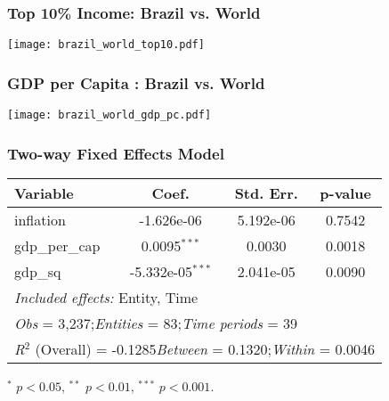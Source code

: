 \documentclass{beamer}
\begin{document}
\begin{frame}
    \frametitle{\Large Top 10\% Income: Brazil vs. World}
    \centering
    \texttt{[image: brazil\_world\_top10.pdf]}
    \vspace{0.3cm}
    \footnotesize
\end{frame}

\begin{frame}
    \frametitle{\Large GDP per Capita : Brazil vs. World}
    \centering
    \texttt{[image: brazil\_world\_gdp\_pc.pdf]}
    \vspace{0.3cm}
    \footnotesize
\end{frame}

\begin{frame}
    \frametitle{\Large Two-way Fixed Effects Model}
    \small
    \begin{threeparttable}
      \begin{tabular}{l c c c}
        \toprule
        \textbf{\textcolor{pred}{Variable}} & \textbf{\textcolor{pred}{Coef.}} & \textbf{\textcolor{pred}{Std. Err.}} & \textbf{\textcolor{pred}{p-value}} \\
        \midrule
        inflation        & -1.626e-06 & 5.192e-06 & 0.7542 \\
        gdp\_per\_cap    & 0.0095$^{***}$ & 0.0030 & 0.0018 \\
        gdp\_sq          & -5.332e-05$^{***}$ & 2.041e-05 & 0.0090 \\
        \midrule
        \multicolumn{4}{l}{\textit{Included effects:} Entity, Time} \\
        \multicolumn{4}{l}{\textit{Obs} = 3{,}237;\quad \textit{Entities} = 83;\quad \textit{Time periods} = 39} \\
        \multicolumn{4}{l}{\textit{R}$^{2}$ (Overall) = -0.1285\quad \textit{Between} = 0.1320;\quad \textit{Within} = 0.0046} \\
        \bottomrule
      \end{tabular}
      \begin{tablenotes}[flushleft]
        \footnotesize
        \item $^{*}$ $p<0.05$, $^{**}$ $p<0.01$, $^{***}$ $p<0.001$.
      \end{tablenotes}
    \end{threeparttable}
  \end{frame}
\end{document}
